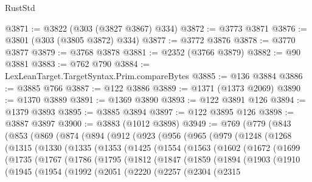 \begin{lexlean}{RustStd}
\begin{coremodule}
@3871 := @3822 (@303 (@3827 @3867) @334)
@3872 := @3773 @3871
@3876 := @3801 (@303 (@3805 @3872) @334)
@3877 := @3772 @3876
@3878 := @3770 @3877
@3879 := @3768 @3878
@3881 := @2352 (@3766 @3879)
@3882 := @90 @3881
@3883 := @762 @790
@3884 := LexLeanTarget.TargetSyntax.Prim.compareBytes
@3885 := @136 @3884
@3886 := @3885 @766
@3887 := @122 @3886
@3889 := @1371 (@1373 @2069)
@3890 := @1370 @3889
@3891 := @1369 @3890
@3893 := @122 @3891 @126
@3894 := @1379 @3893
@3895 := @3885 @3894
@3897 := @122 @3895 @126
@3898 := @3887 @3897
@3900 := @3883 (@1012 @3898)
@3949 := @769
    (@779
      (@843
        (@853
          (@869
            (@874
              (@894
                (@912
                  (@923
                    (@956
                      (@965
                        (@979
                          (@1248
                            (@1268
                              (@1315
                                (@1330
                                  (@1335
                                    (@1353
                                      (@1425
                                        (@1554
                                          (@1563
                                            (@1602
                                              (@1672
                                                (@1699
                                                  (@1735
                                                    (@1767
                                                      (@1786
                                                        (@1795
                                                          (@1812
                                                            (@1847
                                                              (@1859
                                                                (@1894
                                                                  (@1903
                                                                    (@1910
                                                                      (@1945
                                                                        (@1954
                                                                          (@1992
                                                                            (@2051
                                                                              (@2220
                                                                                (@2257
                                                                                  (@2304
                                                                                    (@2315

\end{coremodule}
\end{lexlean}
